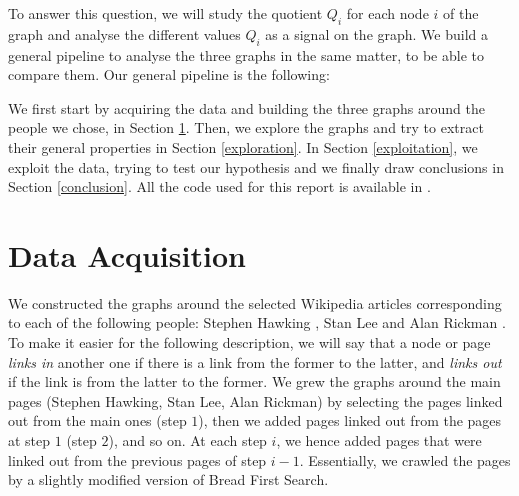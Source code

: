 \documentclass[conference]{IEEEtran}
\begin{document}
To answer this question, we will study the quotient $Q_i$ for each node $i$ of the graph and analyse the different values $Q_i$  as a signal on the graph. We build a general pipeline to analyse the three graphs in the same matter, to be able to compare them. Our general pipeline is the following: 

\begin{center}

\end{center}

We first start by acquiring the data and building the three graphs around the people we chose, in Section \ref{acquisition}. Then, we explore the graphs and try to extract their general properties in Section \ref{exploration}. In Section \ref{exploitation}, we exploit the data, trying to test our hypothesis and we finally draw conclusions in Section \ref{conclusion}. All the code used for this report is available in \cite{Repo}. 

\section{Data Acquisition} \label{acquisition}

We constructed the graphs around the selected Wikipedia articles corresponding to each of the following people: Stephen Hawking \cite{stephenhawking}, Stan Lee \cite{stanlee} and Alan Rickman \cite{alanrickman}. To make it easier for the following description, we will say that a node or page \textit{links in} another one if there is a link from the former to the latter, and \textit{links out} if the link is from the latter to the former. We grew the graphs around the main pages (Stephen Hawking, Stan Lee, Alan Rickman) by selecting the pages linked out from the main ones (step $1$), then we added pages linked out from the pages at step $1$ (step $2$), and so on. At each step $i$, we hence added pages that were linked out from the previous pages of step $i-1$. Essentially, we crawled the pages by a slightly modified version of Bread First Search. 
\end{document}
